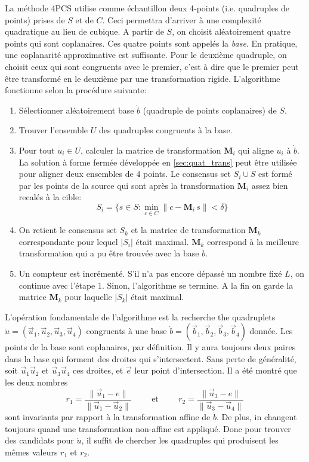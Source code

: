 \documentclass[a4paper,10pt]{scrreprt}
\begin{document}
La méthode 4PCS utilise comme échantillon deux 4-points (i.e. quadruples de points) prises de $S$ et de $C$. Ceci permettra d'arriver à une complexité quadratique au lieu de cubique. A partir de $S$, on choisit aléatoirement quatre points qui sont coplanaires. Ces quatre points sont appelés la \emph{base}. En pratique, une coplanarité approximative est suffisante. Pour le deuxième quadruple, on choisit ceux qui sont congruents avec le premier, c'est à dire que le premier peut être transformé en le deuxième par une transformation rigide. L'algorithme fonctionne selon la procédure suivante:
\begin{enumerate}
	\item Sélectionner aléatoirement base $\dot{b}$ (quadruple de points coplanaires) de $S$.
	\item Trouver l'ensemble $U$ des quadruples congruents à la base.
	\item Pour tout $\dot{u}_i \in U$, calculer la matrice de transformation $\mathbf{M}_i$ qui aligne $\dot{u}_i$ à $\dot{b}$. La solution à forme fermée développée en \ref{sec:quat_trans} peut être utilisée pour aligner deux ensembles de $4$ points. Le consensus set $S_i \cup S$ est formé par les points de la source qui sont après la transformation $\mathbf{M}_i$ assez bien recalés à la cible:
		\begin{equation}
			S_i = \{ s \in S : \min_{c \in C} \| c - \mathbf{M}_i \, s \| < \delta \}
		\end{equation}
	\item On retient le consensus set $S_k$ et la matrice de transformation $\mathbf{M}_k$ correspondante pour lequel $|S_i|$ était maximal. $\mathbf{M}_k$ correspond à la meilleure transformation qui a pu être trouvée avec la base $\dot{b}$.
	\item Un compteur est incrémenté. S'il n'a pas encore dépassé un nombre fixé $L$, on continue avec l'étape 1. Sinon, l'algorithme se termine. A la fin on garde la matrice $\mathbf{M}_k$ pour laquelle $|S_k|$ était maximal.
\end{enumerate}

L'opération fondamentale de l'algorithme est la recherche the quadruplets $\dot{u} = (\vec{u}_1, \vec{u}_2, \vec{u}_3, \vec{u}_4)$ congruents à une base $\dot{b} = (\vec{b}_1, \vec{b}_2, \vec{b}_3, \vec{b}_4)$ donnée. Les points de la base sont coplanaires, par définition. Il y aura toujours deux paires dans la base qui forment des droites qui s'intersectent. Sans perte de généralité, soit $\vec{u}_1 \vec{u}_2$ et $\vec{u}_3 \vec{u}_4$ ces droites, et $\vec{e}$ leur point d'intersection. Il a été montré que les deux nombres
\begin{equation}
	r_1 = \frac{\| \vec{u}_1 - e \|}{\| \vec{u}_1 - \vec{u}_2 \|}
	\hspace{1cm} \text{et} \hspace{1cm}
	r_2 = \frac{\| \vec{u}_3 - e \|}{\| \vec{u}_3 - \vec{u}_4 \|}
\end{equation}
sont invariants par rapport à la transformation affine de $\dot{b}$. De plus, in changent toujours quand une transformation non-affine est appliqué. Donc pour trouver des candidats pour $\dot{u}$, il suffit de chercher les quadruples qui produisent les mêmes valeurs $r_1$ et $r_2$.
\end{document}
